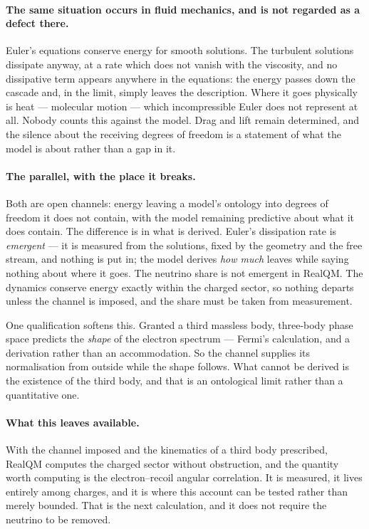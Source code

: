 \documentclass[11pt]{article}
\begin{document}
\paragraph{The same situation occurs in fluid mechanics, and is not regarded as a defect there.} Euler's
equations conserve energy for smooth solutions. The turbulent solutions dissipate anyway, at a rate which
does not vanish with the viscosity, and no dissipative term appears anywhere in the equations: the energy
passes down the cascade and, in the limit, simply leaves the description. Where it goes physically is heat
--- molecular motion --- which incompressible Euler does not represent at all. Nobody counts this against
the model. Drag and lift remain determined, and the silence about the receiving degrees of freedom is a
statement of what the model is about rather than a gap in it.

\paragraph{The parallel, with the place it breaks.} Both are open channels: energy leaving a model's
ontology into degrees of freedom it does not contain, with the model remaining predictive about what it does
contain. The difference is in what is derived. Euler's dissipation rate is \emph{emergent} --- it is
measured from the solutions, fixed by the geometry and the free stream, and nothing is put in; the model
derives \emph{how much} leaves while saying nothing about where it goes. The neutrino share is not emergent
in RealQM. The dynamics conserve energy exactly within the charged sector, so nothing departs unless the
channel is imposed, and the share must be taken from measurement.

One qualification softens this. Granted a third massless body, three-body phase space predicts the
\emph{shape} of the electron spectrum --- Fermi's calculation, and a derivation rather than an
accommodation. So the channel supplies its normalisation from outside while the shape follows. What cannot
be derived is the existence of the third body, and that is an ontological limit rather than a quantitative
one.

\paragraph{What this leaves available.} With the channel imposed and the kinematics of a third body
prescribed, RealQM computes the charged sector without obstruction, and the quantity worth computing is the
electron--recoil angular correlation. It is measured, it lives entirely among charges, and it is where this
account can be tested rather than merely bounded. That is the next calculation, and it does not require the
neutrino to be removed.
\end{document}
